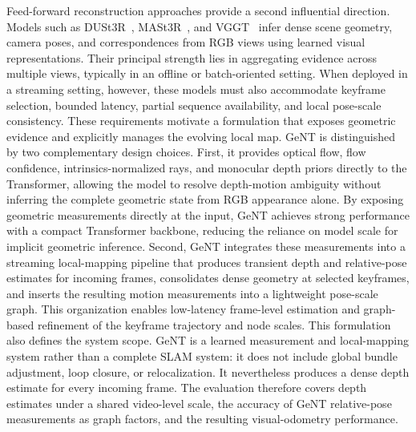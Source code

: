 Feed-forward reconstruction approaches provide a second influential direction.
Models such as DUSt3R~\cite{wang2024dust3r}, MASt3R~\cite{leroy2024grounding}, and VGGT~\cite{wang2025vggt} infer dense scene geometry, camera poses, and correspondences from RGB views using learned visual representations.
Their principal strength lies in aggregating evidence across multiple views, typically in an offline or batch-oriented setting.
When deployed in a streaming setting, however, these models must also accommodate keyframe selection, bounded latency, partial sequence availability, and local pose-scale consistency.
These requirements motivate a formulation that exposes geometric evidence and explicitly manages the evolving local map.
GeNT is distinguished by two complementary design choices.
First, it provides optical flow, flow confidence, intrinsics-normalized rays, and monocular depth priors directly to the Transformer, allowing the model to resolve depth-motion ambiguity without inferring the complete geometric state from RGB appearance alone.
By exposing geometric measurements directly at the input, GeNT achieves strong performance with a compact Transformer backbone, reducing the reliance on model scale for implicit geometric inference.
Second, GeNT integrates these measurements into a streaming local-mapping pipeline that produces transient depth and relative-pose estimates for incoming frames, consolidates dense geometry at selected keyframes, and inserts the resulting motion measurements into a lightweight pose-scale graph.
This organization enables low-latency frame-level estimation and graph-based refinement of the keyframe trajectory and node scales.
This formulation also defines the system scope.
GeNT is a learned measurement and local-mapping system rather than a complete SLAM system: it does not include global bundle adjustment, loop closure, or relocalization.
It nevertheless produces a dense depth estimate for every incoming frame.
The evaluation therefore covers depth estimates under a shared video-level scale, the accuracy of GeNT relative-pose measurements as graph factors, and the resulting visual-odometry performance.

